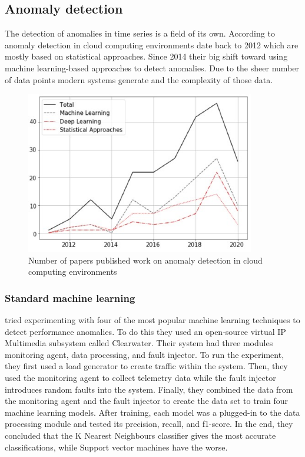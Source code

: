 \subsection{Anomaly detection}


The detection of anomalies in time series is a field of its own. According to \cite{hagemann2020systematic} anomaly detection in cloud computing environments date back to 2012 which are mostly based on statistical approaches. Since 2014 their big shift toward using machine learning-based approaches to detect anomalies. Due to the sheer number of data points modern systems generate and the complexity of those data.

\begin{figure}[H]
    \includegraphics[width=10cm]{assets/literature-review/num-of-anomaly-detection-papers.jpg}
    \caption{Number of papers published work on anomaly detection in cloud computing environments \citep{hagemann2020systematic}}
    \label{fig:num-of-anomaly-detection-paperss}
\end{figure}

\subsubsection{Standard machine learning}


\cite{du2018anomaly} tried experimenting with four of the most popular machine learning techniques to detect performance anomalies. To do this they used an open-source virtual IP Multimedia subsystem called Clearwater. Their system had three modules monitoring agent, data processing, and fault injector. To run the experiment, they first used a load generator to create traffic within the system. Then, they used the monitoring agent to collect telemetry data while the fault injector introduces random faults into the system. Finally, they combined the data from the monitoring agent and the fault injector to create the data set to train four machine learning models. After training, each model was a plugged-in to the data processing module and tested its precision, recall, and f1-score. In the end, they concluded that the K Nearest Neighbours classifier gives the most accurate classifications, while Support vector machines have the worse.


